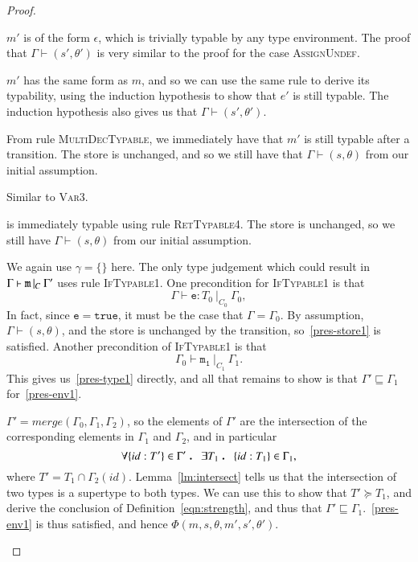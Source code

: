 \begin{proof}
  \begin{case}
	$m'$ is of the form $\epsilon$, which is trivially typable by any type environment.
	The proof that $\Gamma\vdash(s',\theta')$ is very similar to the proof for
	the case \textsc{AssignUndef}.
  \end{case}
  \begin{case}
	$m'$ has the same form as $m$, and so we can use the same rule to derive its
	typability, using the induction hypothesis to show that $e'$ is still typable.
	The induction hypothesis also gives us that $\Gamma\vdash(s',\theta')$.
  \end{case}
  \begin{case}[Var3]
	From rule \textsc{MultiDecTypable}, we immediately have that $m'$ is still typable after
	a transition. The store is unchanged, and so we still have that $\Gamma\vdash(s,\theta)$ 
	from our initial assumption.
  \end{case}
  \begin{case}[FuncDef]
	Similar to \textsc{Var3}.
  \end{case}
  \begin{case}[Return2]
	 is immediately typable using rule \textsc{RetTypable4}. 
	The store is unchanged, so we still have $\Gamma\vdash(s,\theta)$ from our initial
	assumption.
  \end{case}

  \begin{case}[If2]

	We again use $\gamma=\{\}$ here. The only type judgement which could result in $\Gamma{}\vdash\mathtt{m}\, |_C \:\Gamma '$ uses rule
	\textsc{IfTypable1}. One precondition for \textsc{IfTypable1} is that
	$$\Gamma\vdash\mathtt{e}:T_0\ |_{C_0}\ \Gamma_0,$$ 
	In fact, since $\mathtt{e} = \mathtt{true}$, it must be the case that $\Gamma=\Gamma_0$.
	By assumption, $\Gamma\vdash(s,\theta)$, and the store is unchanged by the transition, so~\eqref{pres-store1}
	is satisfied. Another precondition of \textsc{IfTypable1} is that 
	$$\Gamma_0\vdash\mathtt{m_1}\ |_{C_1}\ \Gamma_1.$$
	This gives us~\eqref{pres-type1} directly, and all that remains to show is
	that $\Gamma'\sqsubseteq \Gamma_1$ for~\eqref{pres-env1}.

	$\Gamma'=merge(\Gamma_0,\Gamma_1,\Gamma_2)$, so the elements of $\Gamma'$
	are the intersection of the corresponding elements in $\Gamma_1$ and
	$\Gamma_2$, and in particular 
	$$\forall \{id:T'\}\in\Gamma'\qdot \exists T_1 \qdot \{id:T_1\}\in\Gamma_1,$$
   	where $T' =	T_1\cap\Gamma_2(id)$. Lemma~\ref{lm:intersect} tells us that the
	intersection of two types is a supertype to both types. We can use this to
	show that $T'\succeq T_1$, and 
	derive the conclusion of Definition~\ref{eqn:strength}, and thus that
	$\Gamma'\sqsubseteq\Gamma_1$.~\eqref{pres-env1} is thus satisfied, and hence
	$\Phi(m,s,\theta,m',s',\theta')$.


\end{case}
\end{proof}
